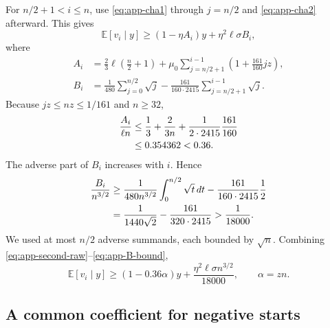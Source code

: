\documentclass[twoside]{article}
\newcommand{\E}{\mathbb E}
\begin{document}
For $n/2+1<i\le n$, use \eqref{eq:app-cha1} through $j=n/2$ and
\eqref{eq:app-cha2} afterward. This gives
\begin{equation}
 \E[v_i\mid y]\ge(1-\eta A_i)y+\eta^2\ell\sigma B_i,
 \label{eq:app-second-raw}
\end{equation}
where
\begin{align}
 A_i&=\frac23\ell\left(\frac n2+1\right)
 +\mu_0\sum_{j=n/2+1}^{i-1}
 \left(1+\frac{161}{160}jz\right),                 \label{eq:app-A}\\
 B_i&=\frac1{480}\sum_{j=0}^{n/2}\sqrt j
 -\frac{161}{160\cdot2415}
 \sum_{j=n/2+1}^{i-1}\sqrt j.                     \label{eq:app-B}
\end{align}
Because $jz\le nz\le1/161$ and $n\ge32$,
\begin{align}
 \frac{A_i}{\ell n}
 &\le\frac13+\frac{2}{3n}
 +\frac{1}{2\cdot2415}\frac{161}{160}\notag\\
 &\le0.354362<0.36.                                 \label{eq:app-A-bound}
\end{align}
The adverse part of $B_i$ increases with $i$. Hence
\begin{align}
 \frac{B_i}{n^{3/2}}
 &\ge \frac{1}{480n^{3/2}}
 \int_0^{n/2}\sqrt t\,dt
 -\frac{161}{160\cdot2415}\frac12\notag\\
 &=\frac{1}{1440\sqrt2}
 -\frac{161}{320\cdot2415}
 >\frac1{18000}.                                    \label{eq:app-B-bound}
\end{align}
We used at most $n/2$ adverse summands, each bounded by $\sqrt n$.
Combining \eqref{eq:app-second-raw}--\eqref{eq:app-B-bound},
\begin{equation}
 \E[v_i\mid y]
 \ge(1-0.36\alpha)y
 +\frac{\eta^2\ell\sigma n^{3/2}}{18000},
 \qquad \alpha=zn.                                  \label{eq:app-second}
\end{equation}

\subsection{A common coefficient for negative starts}
\end{document}
